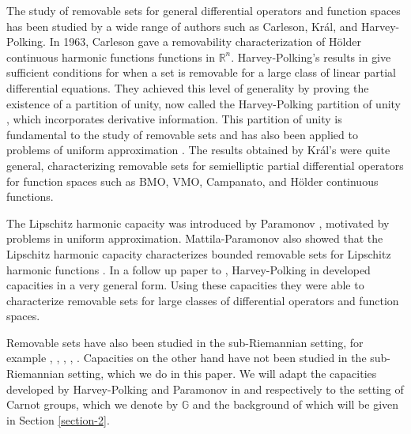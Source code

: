 \documentclass[12pt,a4paper,reqno]{amsart}
\newcommand{\R}{\mathbb{R}}
\newcommand{\G}{\mathbb{G}}
\numberwithin{equation}{section}
\theoremstyle{definition}
\begin{document}
The study of removable sets for general differential operators and function spaces has been studied by a wide range of authors such as Carleson, Kr\'{a}l, and Harvey-Polking. In 1963, Carleson \cite{Car} gave a removability characterization of H\"{o}lder continuous harmonic functions functions in $\R^n$. Harvey-Polking's results in \cite{HP} give sufficient conditions for when a set is removable for a large class of linear partial differential equations. They achieved this level of generality by proving the existence of a partition of unity, now called the Harvey-Polking partition of unity \cite[Lemma 3.1]{HP}, which incorporates derivative information. This partition of unity is fundamental to the study of removable sets and has also been applied to problems of uniform approximation \cite{P}. The results obtained by  Kr\'{a}l's \cite{Kr}  were quite general, characterizing removable sets for semielliptic partial differential operators for function spaces such as BMO, VMO, Campanato, and H\"{o}lder continuous functions. 

The Lipschitz harmonic capacity was introduced by Paramonov \cite[(2.2)]{P}, motivated by problems in uniform approximation. Mattila-Paramonov \cite{MP} also showed that the Lipschitz harmonic capacity characterizes bounded removable sets for Lipschitz harmonic functions \cite[Proposition 2.2]{MP}. In a follow up paper to \cite{HP}, Harvey-Polking in \cite{HP2} developed capacities in a very general form. Using these capacities they were able to characterize removable sets for large classes of differential operators and function spaces.

Removable sets have also been studied in the sub-Riemannian setting, for example \cite{CMat}, \cite{CMT}, \cite{CT}, \cite{CFO}, \cite{CLZ}. Capacities on the other hand have not been studied in the sub-Riemannian setting, which we do in this paper. We will adapt the capacities developed by Harvey-Polking and Paramonov in \cite{HP2} and \cite{P} respectively to the setting of Carnot groups, which we denote by $\G$ and the background of which will be given in Section \ref{section-2}.
\end{document}

